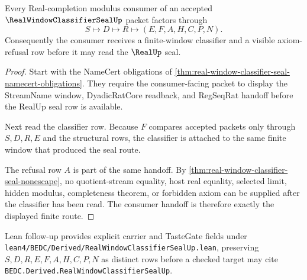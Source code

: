 \begin{theorem}
\label{thm:real-window-classifier-seal-consumer-handoff}
Every Real-completion modulus consumer of an accepted $\RealWindowClassifierSealUp$ packet factors through
$$
S\longmapsto D\longmapsto R\longmapsto(E,F,A,H,C,P,N).
$$
Consequently the consumer receives a finite-window classifier and a visible axiom-refusal row before it may read the $\RealUp$ seal.
\end{theorem}
\begin{proof}
Start with the NameCert obligations of \autoref{thm:real-window-classifier-seal-namecert-obligations}. They require the consumer-facing packet to display the StreamName window, DyadicRatCore readback, and RegSeqRat handoff before the RealUp seal row is available.

Next read the classifier row. Because $F$ compares accepted packets only through $S,D,R,E$ and the structural rows, the classifier is attached to the same finite window that produced the seal route.

The refusal row $A$ is part of the same handoff. By \autoref{thm:real-window-classifier-seal-nonescape}, no quotient-stream equality, host real equality, selected limit, hidden modulus, completeness theorem, or forbidden axiom can be supplied after the classifier has been read. The consumer handoff is therefore exactly the displayed finite route.
\end{proof}



Lean follow-up provides explicit carrier and TasteGate fields under \texttt{lean4/BEDC/Derived/RealWindowClassifierSealUp.lean}, preserving $S,D,R,E,F,A,H,C,P,N$ as distinct rows before a checked target may cite \texttt{BEDC.Derived.RealWindowClassifierSealUp}.


